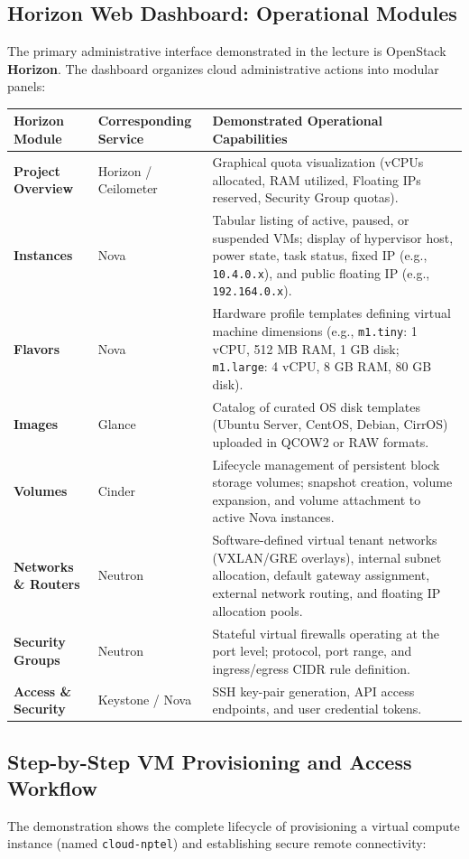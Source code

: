 \documentclass[11pt,a4paper,openany]{report}
\begin{document}
\subsection{Horizon Web Dashboard: Operational Modules}
The primary administrative interface demonstrated in the lecture is OpenStack \textbf{Horizon}. The dashboard organizes cloud administrative actions into modular panels:

\begin{center}
\begin{tabularx}{\textwidth}{>{\bfseries}l p{3.2cm} X}
\toprule
Horizon Module & Corresponding Service & Demonstrated Operational Capabilities\\
\midrule
Project Overview & Horizon / Ceilometer & Graphical quota visualization (vCPUs allocated, RAM utilized, Floating IPs reserved, Security Group quotas).\\
Instances & Nova & Tabular listing of active, paused, or suspended VMs; display of hypervisor host, power state, task status, fixed IP (e.g., \texttt{10.4.0.x}), and public floating IP (e.g., \texttt{192.164.0.x}).\\
Flavors & Nova & Hardware profile templates defining virtual machine dimensions (e.g., \texttt{m1.tiny}: 1 vCPU, 512 MB RAM, 1 GB disk; \texttt{m1.large}: 4 vCPU, 8 GB RAM, 80 GB disk).\\
Images & Glance & Catalog of curated OS disk templates (Ubuntu Server, CentOS, Debian, CirrOS) uploaded in QCOW2 or RAW formats.\\
Volumes & Cinder & Lifecycle management of persistent block storage volumes; snapshot creation, volume expansion, and volume attachment to active Nova instances.\\
Networks \& Routers & Neutron & Software-defined virtual tenant networks (VXLAN/GRE overlays), internal subnet allocation, default gateway assignment, external network routing, and floating IP allocation pools.\\
Security Groups & Neutron & Stateful virtual firewalls operating at the port level; protocol, port range, and ingress/egress CIDR rule definition.\\
Access \& Security & Keystone / Nova & SSH key-pair generation, API access endpoints, and user credential tokens.\\
\bottomrule
\end{tabularx}
\end{center}

\subsection{Step-by-Step VM Provisioning and Access Workflow}
The demonstration shows the complete lifecycle of provisioning a virtual compute instance (named \texttt{cloud-nptel}) and establishing secure remote connectivity:
\end{document}
